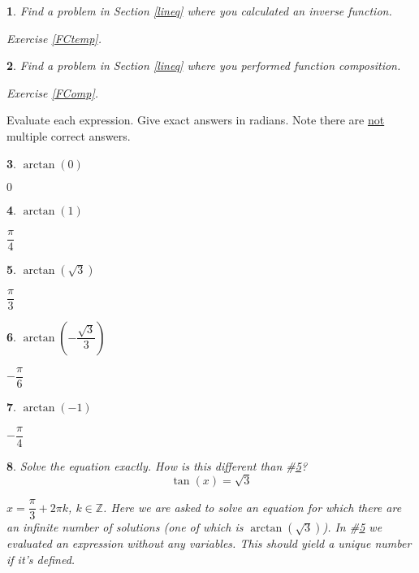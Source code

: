 \documentclass{amsbook}
\newtheorem{exc}{}
\newenvironment{ex}{\begin{exc}\normalfont}{\end{exc}}
\numberwithin{section}{chapter}
\numberwithin{equation}{chapter}
\newcommand{\Z}{\mathbb{Z}}
\begin{document}
\begin{ex}
	Find a problem in Section \ref{lineq} where you calculated an inverse function.
	\begin{sol}
		Exercise \ref{FCtemp}.
	\end{sol}
\end{ex}


\begin{ex}
	Find a problem in Section \ref{lineq} where you performed function composition.
\begin{sol}
	Exercise \ref{FComp}.
\end{sol}
\end{ex}

Evaluate each expression. Give exact answers in radians. Note there are \underline{not} multiple correct answers.
\begin{multicols}{2}
\begin{ex}
	$\arctan(0)$
	\begin{sol}
		$0$
	\end{sol}
\end{ex}

\begin{ex}
	$\arctan(1)$
	\begin{sol}
		$\dfrac{\pi}{4}$
	\end{sol}
\end{ex}


\begin{ex} \label{sqrt3tan}
	$\arctan\left(\sqrt{3} \right)$
	\begin{sol}
		$\dfrac{\pi}{3}$
	\end{sol}
\end{ex}


\begin{ex}
	$\arctan\left(-\dfrac{\sqrt{3}}{3} \right)$
	\begin{sol}
		$-\dfrac{\pi}{6}$
	\end{sol}
\end{ex}

\begin{ex}
	$\arctan\left(-1 \right)$
	\begin{sol}
		$-\dfrac{\pi}{4}$
	\end{sol}
\end{ex}

\end{multicols}


\begin{ex}
	Solve the equation exactly. How is this different than \#\ref{sqrt3tan}? $$ \tan(x) = \sqrt{3} $$
	\begin{sol}
		$x = \dfrac{\pi}{3} + 2\pi k$, $k\in\Z$. Here we are asked to solve an equation for which there are an infinite number of solutions (one of which is $\arctan(\sqrt{3})$). In \#\ref{sqrt3tan} we evaluated an expression without any variables. This should yield a unique number if it's defined.
	\end{sol}
\end{ex}
\end{document}
